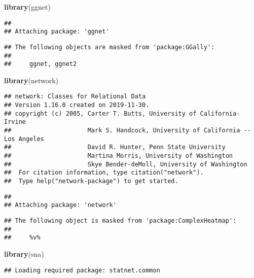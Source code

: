 \documentclass[]{article}
\newenvironment{Shaded}{\begin{snugshade}}{\end{snugshade}}
\newcommand{\KeywordTok}[1]{\textcolor[rgb]{0.13,0.29,0.53}{\textbf{#1}}}
\newcommand{\NormalTok}[1]{#1}
\begin{document}
\begin{Shaded}
\begin{Highlighting}[]
\KeywordTok{library}\NormalTok{(ggnet)}
\end{Highlighting}
\end{Shaded}

\begin{verbatim}
## 
## Attaching package: 'ggnet'
\end{verbatim}

\begin{verbatim}
## The following objects are masked from 'package:GGally':
## 
##     ggnet, ggnet2
\end{verbatim}

\begin{Shaded}
\begin{Highlighting}[]
\KeywordTok{library}\NormalTok{(network)}
\end{Highlighting}
\end{Shaded}

\begin{verbatim}
## network: Classes for Relational Data
## Version 1.16.0 created on 2019-11-30.
## copyright (c) 2005, Carter T. Butts, University of California-Irvine
##                     Mark S. Handcock, University of California -- Los Angeles
##                     David R. Hunter, Penn State University
##                     Martina Morris, University of Washington
##                     Skye Bender-deMoll, University of Washington
##  For citation information, type citation("network").
##  Type help("network-package") to get started.
\end{verbatim}

\begin{verbatim}
## 
## Attaching package: 'network'
\end{verbatim}

\begin{verbatim}
## The following object is masked from 'package:ComplexHeatmap':
## 
##     %v%
\end{verbatim}

\begin{Shaded}
\begin{Highlighting}[]
\KeywordTok{library}\NormalTok{(sna)}
\end{Highlighting}
\end{Shaded}

\begin{verbatim}
## Loading required package: statnet.common
\end{verbatim}
\end{document}
